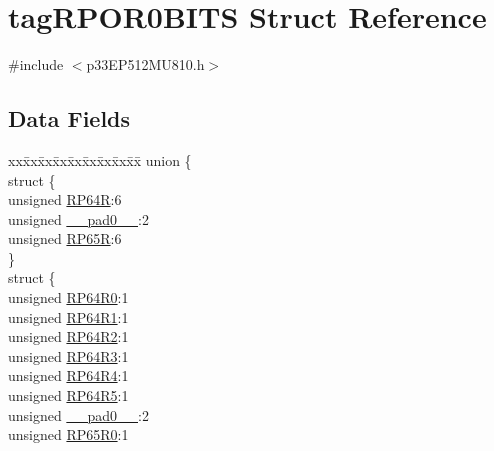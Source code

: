 \hypertarget{structtag_r_p_o_r0_b_i_t_s}{}\section{tag\+R\+P\+O\+R0\+B\+I\+TS Struct Reference}
\label{structtag_r_p_o_r0_b_i_t_s}


{\ttfamily \#include $<$p33\+E\+P512\+M\+U810.\+h$>$}

\subsection*{Data Fields}
\begin{DoxyCompactItemize}
\item 
\begin{tabbing}
xx\=xx\=xx\=xx\=xx\=xx\=xx\=xx\=xx\=\kill
union \{\\
\>struct \{\\
\>\>unsigned \hyperlink{structtag_r_p_o_r0_b_i_t_s_a913c7e12872e5533bd69d0baebef35f4}{RP64R}:6\\
\>\>unsigned \hyperlink{structtag_r_p_o_r0_b_i_t_s_adf71f3d8410c1f1dbbc96680a92c49af}{\_\_pad0\_\_}:2\\
\>\>unsigned \hyperlink{structtag_r_p_o_r0_b_i_t_s_aee47542d2839696fe2960d1536db1f20}{RP65R}:6\\
\>\} \\
\>struct \{\\
\>\>unsigned \hyperlink{structtag_r_p_o_r0_b_i_t_s_ab8c78ad68f30fb9edcce1d940ebd3a2c}{RP64R0}:1\\
\>\>unsigned \hyperlink{structtag_r_p_o_r0_b_i_t_s_a44ab5a54545be79d5cb7aebc1a538174}{RP64R1}:1\\
\>\>unsigned \hyperlink{structtag_r_p_o_r0_b_i_t_s_ad15aae29647eb73fe2ab32113c2b642e}{RP64R2}:1\\
\>\>unsigned \hyperlink{structtag_r_p_o_r0_b_i_t_s_a7ddd6da26c5e11fa4e716024f934e44f}{RP64R3}:1\\
\>\>unsigned \hyperlink{structtag_r_p_o_r0_b_i_t_s_ab85774e69eaf2b451f78c2c39fb0dfd0}{RP64R4}:1\\
\>\>unsigned \hyperlink{structtag_r_p_o_r0_b_i_t_s_aa762cb18f9432f7dbc757fa143a972fc}{RP64R5}:1\\
\>\>unsigned \hyperlink{structtag_r_p_o_r0_b_i_t_s_adf71f3d8410c1f1dbbc96680a92c49af}{\_\_pad0\_\_}:2\\
\>\>unsigned \hyperlink{structtag_r_p_o_r0_b_i_t_s_aeaa8de6b77c54f954d9088ae6ffa1420}{RP65R0}:1\\

\end{tabbing}
\end{DoxyCompactItemize}

